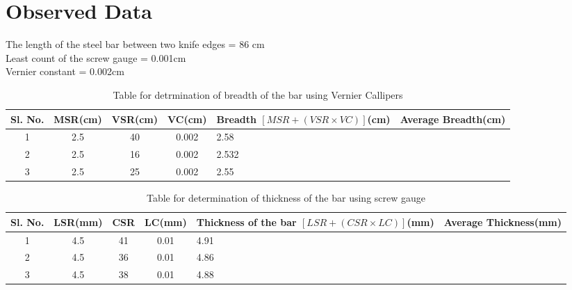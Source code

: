 \documentclass[12pt]{article}
\begin{document}
	\section{Observed Data}
	
	The	length	of	the	steel	bar	between	two	knife	edges	=	86	cm\\
	Least	count	of	the	screw	gauge	=	0.001cm\\
	Vernier	constant	=	0.002cm\\

	\begin{table}[H]
		\centering
		\def\arraystretch{1.5}
		\caption{	Table	for	detrmination	of	breadth	of	the	bar	using	Vernier	Callipers}
		\begin{tabular}{|c||c|c|c|p{4cm}|c|}
			\hline
			Sl. No.&MSR(cm)&VSR(cm)&VC(cm)&Breadth $[MSR+(VSR\times VC)]$(cm)&Average Breadth(cm)\\
			\hline
			\hline
			1&2.5&40&0.002&2.58&\cellcolor{red!50}\\
			\hline
			2&2.5&16&0.002&2.532& \cellcolor{red!50}\color{black}{2.55}\\
			\hline
			3&2.5&25&0.002&2.55&\cellcolor{red!50}\\
			\hline
		\end{tabular}
		\label{tab:VC}
	\end{table}

		\begin{table}[H]
		\centering
		\def\arraystretch{1.5}
		\caption{Table	for	determination	of	thickness	of	the	bar	using	screw	gauge}
		\begin{tabular}{|c||c|c|c|p{4cm}|c|}
			\hline
			Sl. No.&LSR(mm)&CSR&LC(mm)&Thickness of the bar $[LSR	+	(CSR	\times	LC)]$(mm)&Average Thickness(mm)\\
			\hline
			\hline
			1&4.5&41&0.01&4.91&\cellcolor{green!50}\\
			\hline
			2&4.5&36&0.01&4.86&\cellcolor{green!50}\color{black}{4.88}\\
			\hline
			3&4.5&38&0.01&4.88&\cellcolor{green!50}\\
			\hline
		\end{tabular}
		\label{tab:SG}
	\end{table}
\end{document}
